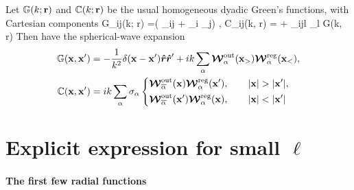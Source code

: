 \documentclass[letterpaper]{article}
\begin{document}
Let $\mathbb{G}(k; \mathbf{r})$ and $\mathbb{C}(k; \mathbf{r})$ be the usual
homogeneous dyadic Green's functions, with Cartesian components
{
 \mb G_{ij}(k; \vb r)
=\Big( \delta_{ij} + \partial_i \partial_j\Big)
  ,
  \qquad
\mb C_{ij}(k, \vb r) = + \varepsilon_{ijl} 
                         \partial_l \mb G(k, \vb r)
}
Then have the spherical-wave expansion
\begin{subequations}
\begin{align}
  \mb G(\vb x, \vb x^\prime)
&= -\frac{1}{k^2}\delta(\vb x-\vb x^\prime)\vbhat{r}\vbhat{r}^\prime
     + ik \sum_\alpha 
          \bmc W_\alpha\sups{out}(\vb x_>)
          \bmc W_\alpha\sups{reg}(\vb x_<),
\\
\mb C(\vb x, \vb x^\prime)
&= ik\sum_{\alpha} \sigma_\alpha
   \begin{dcases}
     \bmc W_{\overline \alpha}\sups{out}(\vb x)
     \bmc W_{\alpha}\sups{reg}(\vb x^\prime), \qquad |\vb x|>|\vb x^\prime|,
\\
     \bmc W_{\overline \alpha}\sups{out}(\vb x^\prime)
     \bmc W_{\alpha}\sups{reg}(\vb x), \qquad |\vb x|<|\vb x^\prime|
     \end{dcases} 
\end{align}
\label{GCExpansions}
\end{subequations}

\newpage
\section{Explicit expression for small $\ell$}
\label{ExplicitExpressionSection}

\paragraph{The first few radial functions}
\end{document}
